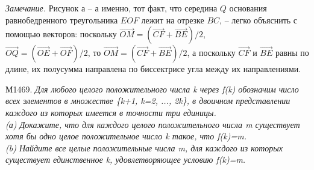 \documentclass{article}
\begin{document}
\begin{multicols}{2}
\textit{Замечание.} Рисунок $а$ -- а именно, тот факт, что середина $Q$ основания равнобедренного треугольника  $EOF$ лежит на отрезке $BC$, -- легко объяснить с помощью векторов: поскольку $\overrightarrow{OM} = \left(\overrightarrow{CF} + \overrightarrow{BE}\right)\bigg/2$,\\
$\overrightarrow{OQ} = \left(\overrightarrow{OE} + \overrightarrow{OF}\right)\bigg/2$, то $\overrightarrow{OM} = \left(\overrightarrow{CF} + \overrightarrow{BE}\right)\bigg/2$, а поскольку $\overrightarrow{CF}$ и $\overrightarrow{BE}$ равны по длине, их полусумма направлена по биссектрисе угла между их направлениями.\\\par

М1469. \textit{Для любого целого положительного числа k через f(k) обозначим число всех элементов в множестве \{k+1, k=2, ..., 2k\}, в двоичном представлении каждого из которых имеется в точности три единицы.\\
(а) Докажите, что для каждого целого положительного числа m существует хотя бы одно целое положительное число k такое, что f(k)=m.\\
(b) Найдите все целые положительные числа m, для каждого из которых существует единственное k, удовлетворяющее условию f(k)=m.}\\\par


\end{multicols}
\end{document}
